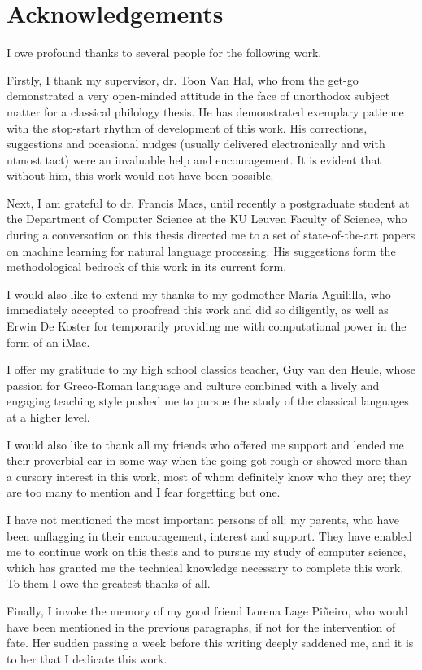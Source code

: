 

\begingroup
\let\clearpage\relax
\let\cleardoublepage\relax
\let\cleardoublepage\relax

\chapter{Acknowledgements}
\label{chap:acknowledgments}
\mtcaddchapter
I owe profound thanks to several people for the following
work. 

Firstly, I thank my supervisor, dr. Toon Van Hal, who from the get-go
demonstrated a very open-minded attitude in the face of unorthodox
subject matter for a classical philology thesis. He has demonstrated
exemplary patience with the stop-start rhythm of development of this
work. His corrections, suggestions and occasional nudges (usually
delivered electronically and with utmost tact) were an invaluable help
and encouragement. It is evident that without him, this work would not
have been possible.

Next, I am grateful to dr. Francis Maes, until recently a postgraduate
student at the Department of Computer Science at the KU Leuven Faculty
of Science, who during a conversation on this thesis directed me to a
set of state-of-the-art papers on machine learning for natural
language processing. His suggestions form the methodological bedrock
of this work in its current form.

I would also like to extend my thanks to my godmother Mar\'ia
Aguililla, who immediately accepted to proofread this work and did so
diligently, as well as Erwin De Koster for temporarily providing me
with computational power in the form of an iMac.

I offer my gratitude to my high school classics teacher, Guy van den
Heule, whose passion for Greco-Roman language and culture combined
with a lively and engaging teaching style pushed me to pursue the
study of the classical languages at a higher level.

I would also like to thank all my friends who offered me support and lended
me their proverbial ear in some way when the going got rough or showed
more than a cursory interest in this work, most of whom definitely
know who they are; they are too many to mention and I fear forgetting
but one.

I have not mentioned the most important persons of all: my parents,
who have been unflagging in their encouragement, interest and
support. They have enabled me to continue work on this thesis and to
pursue my study of computer science, which has granted me the
technical knowledge necessary to complete this work. To them I owe the
greatest thanks of all.

Finally, I invoke the memory of my good friend Lorena Lage Pi\~neiro,
who would have been mentioned in the previous paragraphs, if not for
the intervention of fate. Her sudden passing a week before this
writing deeply saddened me, and it is to her that I dedicate this
work.

\endgroup



